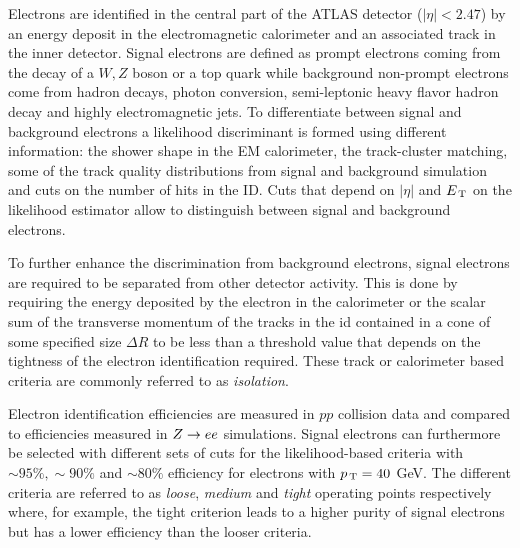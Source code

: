 Electrons are identified in the central part of the ATLAS detector
($|\eta| < 2.47$) by an energy deposit in the electromagnetic calorimeter and an
associated track in the inner detector. Signal electrons are defined as prompt
electrons coming from the decay of a $W, Z$ boson or a top quark while
background non-prompt electrons come from hadron decays, photon conversion,
semi-leptonic heavy flavor hadron decay and highly electromagnetic jets. To
differentiate between signal and background electrons a likelihood discriminant
is formed using different information: the shower shape in the EM calorimeter,
the track-cluster matching, some of the track quality distributions from signal
and background simulation and cuts on the number of hits in the ID\@. Cuts that
depend on $|\eta|$ and $E_\mathrm{\, T}$ on the likelihood estimator allow to distinguish
between signal and background electrons.

To further enhance the discrimination from background electrons, signal
electrons are required to be separated from other detector activity. This is
done by requiring the energy deposited by the electron in the calorimeter or the
scalar sum of the transverse momentum of the tracks in the \gls{id} contained in
a cone of some specified size $\Delta R$ to be less than a threshold value that
depends on the tightness of the electron identification required. These track or
calorimeter based criteria are commonly referred to as \emph{isolation}.

Electron identification efficiencies are measured in $pp$ collision data and
compared to efficiencies measured in $Z \to e e$ simulations. Signal electrons can
furthermore be selected with different sets of cuts for the likelihood-based
criteria with $\sim 95\%, \sim 90\%$ and $\sim 80\%$ efficiency for electrons
with $p_\mathrm{\, T} = 40~$GeV. The different criteria are referred to as \emph{loose},
\emph{medium} and \emph{tight} operating points respectively~\cite{ATL-EL-IDENT}
where, for example, the tight criterion leads to a higher purity of signal
electrons but has a lower efficiency than the looser criteria.

